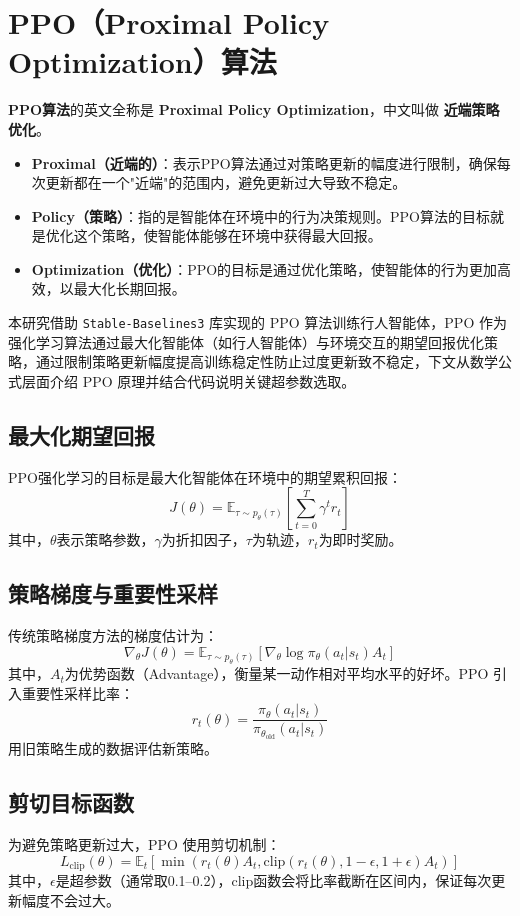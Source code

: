 \section{PPO（Proximal Policy Optimization）算法}

\textbf{PPO算法}的英文全称是 \textbf{Proximal Policy Optimization}，中文叫做 \textbf{近端策略优化}。

\begin{itemize}
    \item \textbf{Proximal（近端的）}：表示PPO算法通过对策略更新的幅度进行限制，确保每次更新都在一个"近端"的范围内，避免更新过大导致不稳定。
    \item \textbf{Policy（策略）}：指的是智能体在环境中的行为决策规则。PPO算法的目标就是优化这个策略，使智能体能够在环境中获得最大回报。
    \item \textbf{Optimization（优化）}：PPO的目标是通过优化策略，使智能体的行为更加高效，以最大化长期回报。
\end{itemize}

本研究借助 \texttt{Stable-Baselines3} 库实现的 PPO 算法训练行人智能体，PPO 作为强化学习算法通过最大化智能体（如行人智能体）与环境交互的期望回报优化策略，通过限制策略更新幅度提高训练稳定性防止过度更新致不稳定，下文从数学公式层面介绍 PPO 原理并结合代码说明关键超参数选取。

\subsection{最大化期望回报}
PPO强化学习的目标是最大化智能体在环境中的期望累积回报：
\[
J(\theta) = \mathbb{E}_{\tau \sim p_{\theta}(\tau)} \left[ \sum_{t=0}^{T} \gamma^t r_t \right]
\]
其中，$\theta$表示策略参数，$\gamma$为折扣因子，$\tau$为轨迹，$r_t$为即时奖励。

\subsection{策略梯度与重要性采样}
传统策略梯度方法的梯度估计为：
\[
\nabla_{\theta} J(\theta) = \mathbb{E}_{\tau \sim p_{\theta}(\tau)} \left[ \nabla_{\theta} \log \pi_{\theta}(a_t|s_t) A_t \right]
\]
其中，$A_t$为优势函数（Advantage），衡量某一动作相对平均水平的好坏。PPO 引入重要性采样比率：
\[
r_t(\theta) = \frac{\pi_{\theta}(a_t|s_t)}{\pi_{\theta_{\text{old}}}(a_t|s_t)}
\]
用旧策略生成的数据评估新策略。

\subsection{剪切目标函数}
为避免策略更新过大，PPO 使用剪切机制：
\[
L_{\text{clip}}(\theta) = \mathbb{E}_t \left[ \min \left( r_t(\theta) A_t, \text{clip}(r_t(\theta), 1 - \epsilon, 1 + \epsilon) A_t \right) \right]
\]
其中，$\epsilon$是超参数（通常取0.1–0.2），$\text{clip}$函数会将比率截断在区间内，保证每次更新幅度不会过大。


